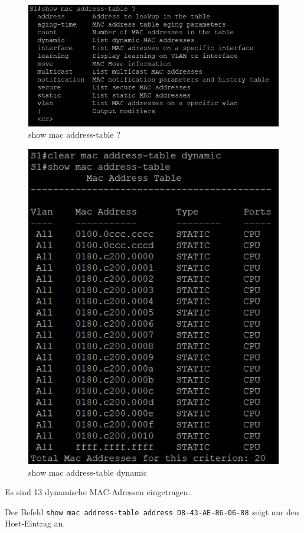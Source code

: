 \documentclass[a4paper]{article}
\newcommand{\abc}{\hfill \break}
\begin{document}
\begin{figure}[h]
	\centering
	\includegraphics[scale=0.4]{images/show-table.otpion.png}
	\caption{show mac address-table ?}
\end{figure}\abc
\begin{figure}[h]
	\centering
	\includegraphics[scale=0.4]{images/dynamic.png}
	\caption{show mac address-table dynamic}
\end{figure}\abc
Es sind 13 dynamische MAC-Adressen eingetragen. \abc

Der Befehl \texttt {show mac address-table address D8-43-AE-86-06-88} zeigt nur den Host-Eintrag an.
\end{document}
